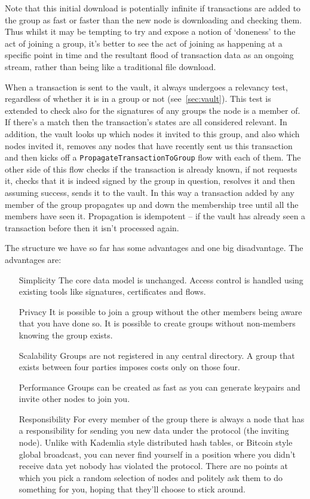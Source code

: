 \documentclass{article}
\begin{document}
Note that this initial download is potentially infinite if transactions are added to the group as fast or faster
than the new node is downloading and checking them. Thus whilst it may be tempting to try and expose a notion of
`doneness' to the act of joining a group, it's better to see the act of joining as happening at a specific point in
time and the resultant flood of transaction data as an ongoing stream, rather than being like a traditional file
download.

When a transaction is sent to the vault, it always undergoes a relevancy test, regardless of whether it is in a
group or not (see~\cref{sec:vault}). This test is extended to check also for the signatures of any groups the node
is a member of. If there's a match then the transaction's states are all considered relevant. In addition, the
vault looks up which nodes it invited to this group, and also which nodes invited it, removes any nodes that have
recently sent us this transaction and then kicks off a \texttt{PropagateTransactionToGroup} flow with each of them.
The other side of this flow checks if the transaction is already known, if not requests it, checks that it is
indeed signed by the group in question, resolves it and then assuming success, sends it to the vault. In this way a
transaction added by any member of the group propagates up and down the membership tree until all the members have
seen it. Propagation is idempotent -- if the vault has already seen a transaction before then it isn't processed
again.

The structure we have so far has some advantages and one big disadvantage. The advantages are:

\begin{itemize}
\item [Simplicity] The core data model is unchanged. Access control is handled using existing tools like signatures, certificates and flows.
\item [Privacy] It is possible to join a group without the other members being aware that you have done so. It is possible to create groups without non-members knowing the group exists.
\item [Scalability] Groups are not registered in any central directory. A group that exists between four parties imposes costs only on those four.
\item [Performance] Groups can be created as fast as you can generate keypairs and invite other nodes to join you.
\item [Responsibility] For every member of the group there is always a node that has a responsibility for sending you
new data under the protocol (the inviting node). Unlike with Kademlia style distributed hash tables, or Bitcoin style
global broadcast, you can never find yourself in a position where you didn't receive data yet nobody has violated the
protocol. There are no points at which you pick a random selection of nodes and politely ask them to do something for
you, hoping that they'll choose to stick around.
\end{itemize}
\end{document}
